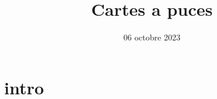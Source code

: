 \documentclass[12pt]{article}
\title{Cartes a puces}
\date{06 octobre 2023}
\theoremstyle{plain}
\theoremstyle{definition}
\begin{document}
\maketitle

\section{intro}
\end{document}

